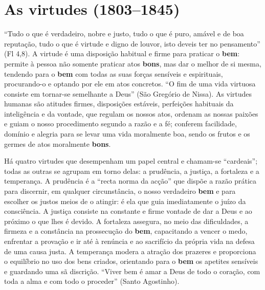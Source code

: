 \section{As virtudes (1803--1845)}

``Tudo o que é verdadeiro, nobre e justo, tudo o que é puro, amável e de boa reputação, tudo o que é virtude e digno de louvor, isto deveis ter no pensamento'' (Fl 4,8). A virtude é uma disposição habitual e firme para praticar o \textbf{bem}: permite à pessoa não somente praticar atos \textbf{bons}, mas dar o melhor de si mesma, tendendo para o \textbf{bem} com todas as suas forças sensíveis e espirituais, procurando-o e optando por ele em atos concretos. ``O fim de uma vida virtuosa consiste em tornar-se semelhante a Deus'' (São Gregório de Nissa). As virtudes humanas são atitudes firmes, disposições estáveis, perfeições habituais da inteligência e da vontade, que regulam os nossos atos, ordenam as nossas paixões e guiam o nosso procedimento segundo a razão e a fé; conferem facilidade, domínio e alegria para se levar uma vida moralmente boa, sendo os frutos e os germes de atos moralmente \textbf{bons}.

Há quatro virtudes que desempenham um papel central e chamam-se ``cardeais''; todas as outras se agrupam em torno delas: a prudência, a justiça, a fortaleza e a temperança. A prudência é a ``recta norma da acção'' que dispõe a razão prática para discernir, em qualquer circunstância, o nosso verdadeiro \textbf{bem} e para escolher os justos meios de o atingir: é ela que guia imediatamente o juízo da consciência. A justiça consiste na constante e firme vontade de dar a Deus e ao próximo o que lhes é devido. A fortaleza assegura, no meio das dificuldades, a firmeza e a constância na prossecução do \textbf{bem}, capacitando a vencer o medo, enfrentar a provação e ir até à renúncia e ao sacrifício da própria vida na defesa de uma causa justa. A temperança modera a atração dos prazeres e proporciona o equilíbrio no uso dos bens criados, orientando para o \textbf{bem} os apetites sensíveis e guardando uma sã discrição. ``Viver bem é amar a Deus de todo o coração, com toda a alma e com todo o proceder'' (Santo Agostinho).

